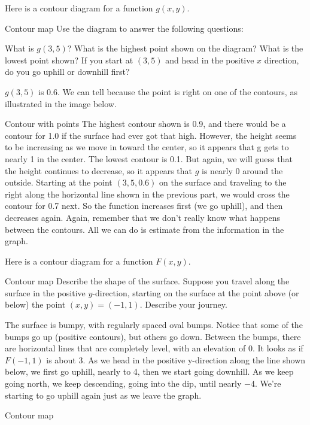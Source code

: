 \begin{example}
Here is a contour diagram for a function $g(x,y)$.

Contour map
Use the diagram to answer the following questions:

What is $g(3,5)$?
What is the highest point shown on the diagram? What is the lowest point shown?
If you start at $(3, 5)$ and head in the positive $x$ direction, do you go uphill or downhill first?

\begin{solution}
$g(3,5)$ is 0.6. We can tell because the point is right on one of the contours, as illustrated in the image below.

Contour with points
The highest contour shown is 0.9, and there would be a contour for 1.0 if the surface had ever got that high. However, the height seems to be increasing as we move in toward the center, so it appears that g gets to nearly 1 in the center. The lowest contour is 0.1. But again, we will guess that the height continues to decrease, so it appears that $g$ is nearly 0 around the outside.
Starting at the point $(3, 5, 0.6)$ on the surface and traveling to the right along the horizontal line shown in the previous part, we would cross the contour for 0.7 next. So the function increases first (we go uphill), and then decreases again.
Again, remember that we don't really know what happens between the contours. All we can do is estimate from the information in the graph.
\end{solution}\end{example}

\begin{example}
Here is a contour diagram for a function $F(x,y)$.

Contour map
Describe the shape of the surface.
Suppose you travel along the surface in the positive $y$-direction, starting on the surface at the point above (or below) the point $(x,y)=(-1,1)$. Describe your journey.

\begin{solution}
  The surface is bumpy, with regularly spaced oval bumps. Notice that some of the bumps go up (positive contours), but others go down. Between the bumps, there are horizontal lines that are completely level, with an elevation of 0.
It looks as if $F(-1,1)$ is about 3. As we head in the positive y-direction along the line shown below, we first go uphill, nearly to 4, then we start going downhill. As we keep going north, we keep descending, going into the dip, until nearly $-4$. We're starting to go uphill again just as we leave the graph.

Contour map
\end{solution}\end{example}

